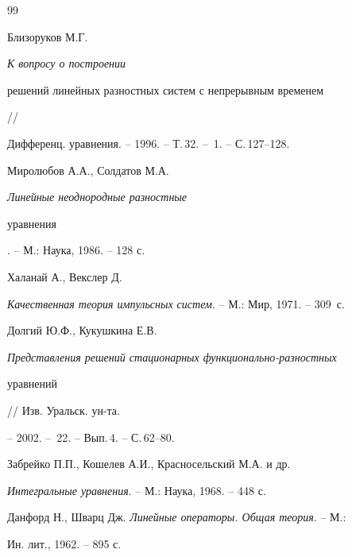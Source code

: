\begin{thebibliography}{99}


Близоруков М.Г. {\em К вопросу о построении


решений линейных разностных систем с непрерывным временем} //


Дифференц. уравнения. -- 1996. -- Т.\,32. -- \No\,1. -- С.\,127--128.




Миролюбов А.А., Солдатов М.А. {\em Линейные неоднородные разностные


уравнения}. -- М.: Наука, 1986. -- 128 с.




Халанай А., Векслер Д.


{\em Качественная теория импульсных систем}. -- М.: Мир, 1971. -- 309~с.




Долгий Ю.Ф., Кукушкина Е.В.


{\em Представления решений стационарных функционально-разностных


уравнений} // Изв. Уральск. ун-та.


-- 2002. -- \No\,22. -- Вып.\,4. -- С.\,62--80.




Забрейко П.П., Кошелев А.И., Красносельский М.А. и др.


{\em Интегральные уравнения}. -- М.: Наука, 1968. -- 448 с.




Данфорд Н., Шварц Дж. {\em Линейные операторы. Общая теория}. -- М.:


Ин. лит., 1962. -- 895 с.





\end{thebibliography}





\vskip 0.5cm












\label{end}






